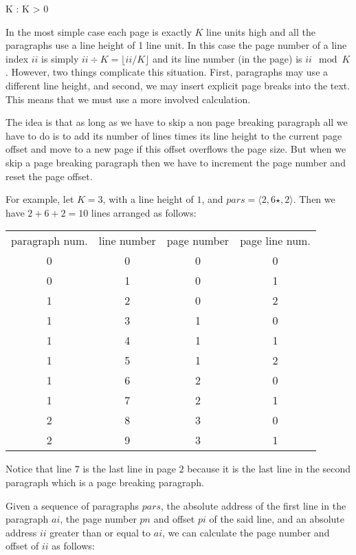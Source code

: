 \documentclass{article}
\begin{document}
\begin{axdef}
	K : \nat
	\where
	K > 0
\end{axdef}

In the most simple case each page is exactly $K$ line units high and all the paragraphs use a line height of 1 line unit. In this case the page number of a line index $ii$ is simply $ii \div K = \lfloor ii / K\rfloor$ and its line number (in the page) is $ii \mod K$. However, two things complicate this situation. First, paragraphs may use a different line height, and second, we may insert explicit page breaks into the text. This means that we must use a more involved calculation.

The idea is that as long as we have to skip a non page breaking paragraph all we have to do is to add its number of lines times its line height to the current page offset and move to a new page if this offset overflows the page size. But when we skip a page breaking paragraph then we have to increment the page number and reset the page offset.

For example, let $K=3$, with a line height of $1$, and $pars = \langle 2,6\star,2\rangle$. Then we have $2+6+2=10$ lines arranged as follows:

\begin{tabular}{cccc}
	paragraph num. & line number & page number & page line num. \\
	0 &	0	&	0 	&	0 \\
	0 &	1	& 	0	& 	1 \\
	1 &	2	& 	0	& 	2 \\
	1 &	3	& 	1	& 	0 \\
	1 & 4	& 	1 	&  	1 \\
	1 & 5	&	1	& 	2 \\
	1 & 6	&	2	&  	0 \\
	1 & 7	&	2	&   1 \\
	2 & 8	&	3	& 	0 \\
	2 &	9	& 	3	& 	1 \\
\end{tabular}

Notice that line $7$ is the last line in page $2$ because it is the last line in the second paragraph which is a page breaking paragraph. 

Given a sequence of paragraphs $pars$, the absolute address of the first line in the paragraph $ai$, the page number $pn$ and offset $pi$ of the said line, and an absolute address $ii$ greater than or equal to $ai$, we can calculate the page number and offset of $ii$ as follows:
\end{document}
